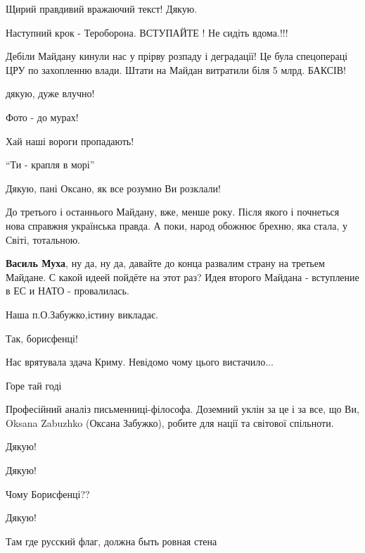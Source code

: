 \begin{itemize}
Щирий правдивий вражаючий текст! Дякую.

Наступний крок - Тероборона. ВСТУПАЙТЕ ! Не сидіть вдома.!!!


Дебіли Майдану кинули нас у прірву розпаду і деградації! Це була спецопераці
ЦРУ по захопленню влади. Штати на Майдан витратили біля 5 млрд. БАКСІВ!


дякую, дуже влучно!

Фото - до мурах!

Хай наші вороги пропадають!

\enquote{Ти - крапля в морі}

Дякую, пані Оксано, як все розумно Ви розклали!


До третього і останнього Майдану, вже, менше року. Після якого і почнеться нова
справжня українська правда. А поки, народ обожнює брехню, яка стала, у Світі,
тотальною.

\begin{itemize} %
\textbf{Василь Муха}, ну да, ну да, давайте до конца развалим страну на третьем Майдане. С какой идеей пойдёте на этот раз? Идея второго Майдана - вступление в ЕС и НАТО - провалилась.
\end{itemize} %

Наша п.О.Забужко,істину викладає.

Так, борисфенці!

Нас врятувала здача Криму. Невідомо чому цього вистачило...

Горе тай годі


Професійний аналіз письменниці-філософа. Доземний уклін за це і за все, що Ви,
Oksana Zabuzhko (Оксана Забужко), робите для нації та світової спільноти.


Дякую!

Дякую!

Чому Борисфенці??

Дякую!

Там где русский флаг, должна быть ровная стена


\end{itemize}
